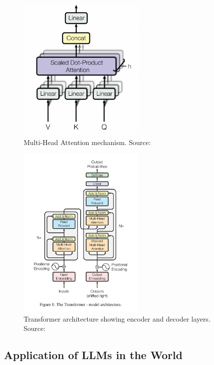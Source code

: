 \begin{figure}[h!]
    \centering
    \includegraphics[width=0.55\textwidth]{Assets/multi_head_attention.png}
    \caption{Multi-Head Attention mechanism. Source: \cite{11}}
    \label{fig:multi_head_attention}
\end{figure}

\begin{figure}[h!]
    \centering
    \includegraphics[width=0.55\textwidth]{Assets/transformer_architecture.png}
    \caption{Transformer architecture showing encoder and decoder layers. Source: \cite{vaswani2017attention}}
    \label{fig:transformer_architecture}
\end{figure}

\subsection{Application of LLMs in the World}

